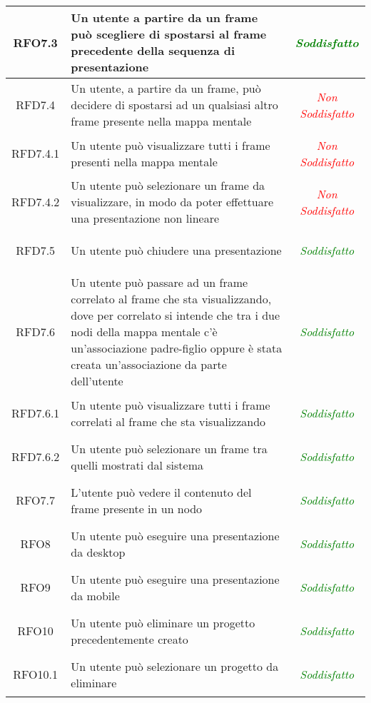 \begin{longtable}{|c|>{\centering}m{7cm}|c|}
\hypertarget{RFO7.3}{RFO7.3} & Un utente a partire da un frame può scegliere di spostarsi al frame precedente della sequenza di presentazione & \textcolor{Green}{\textit{Soddisfatto}}\\ \hline
\hypertarget{RFD7.4}{RFD7.4} & Un utente, a partire da un frame, può decidere di spostarsi ad un qualsiasi altro frame presente nella mappa mentale & \textcolor{Red}{\textit{Non Soddisfatto}}\\ \hline
\hypertarget{RFD7.4.1}{RFD7.4.1} & Un utente può visualizzare tutti i frame presenti nella mappa mentale & \textcolor{Red}{\textit{Non Soddisfatto}}\\ \hline
\hypertarget{RFD7.4.2}{RFD7.4.2} & Un utente può selezionare un frame da visualizzare, in modo da poter effettuare una presentazione non lineare & \textcolor{Red}{\textit{Non Soddisfatto}}\\ \hline
\hypertarget{RFD7.5}{RFD7.5} & Un utente può chiudere una presentazione & \textcolor{Green}{\textit{Soddisfatto}}\\ \hline
\hypertarget{RFD7.6}{RFD7.6} & Un utente può passare ad un frame correlato al frame che sta visualizzando, dove per correlato si intende che tra i due nodi della mappa mentale c’è un’associazione padre-figlio oppure è stata creata un’associazione da parte dell’utente & \textcolor{Green}{\textit{Soddisfatto}}\\ \hline
\hypertarget{RFD7.6.1}{RFD7.6.1} & Un utente può visualizzare tutti i frame correlati al frame che sta visualizzando & \textcolor{Green}{\textit{Soddisfatto}}\\ \hline
\hypertarget{RFD7.6.2}{RFD7.6.2} & Un utente può selezionare un frame tra quelli mostrati dal sistema & \textcolor{Green}{\textit{Soddisfatto}}\\ \hline
\hypertarget{RFO7.7}{RFO7.7} & L'utente può vedere il contenuto del frame presente in un nodo & \textcolor{Green}{\textit{Soddisfatto}}\\ \hline
\hypertarget{RFO8}{RFO8} & Un utente può eseguire una presentazione da desktop & \textcolor{Green}{\textit{Soddisfatto}}\\ \hline
\hypertarget{RFO9}{RFO9} & Un utente può eseguire una presentazione da mobile & \textcolor{Green}{\textit{Soddisfatto}}\\ \hline
\hypertarget{RFO10}{RFO10} & Un utente può eliminare un progetto precedentemente creato & \textcolor{Green}{\textit{Soddisfatto}}\\ \hline
\hypertarget{RFO10.1}{RFO10.1} & Un utente può selezionare un progetto da eliminare & \textcolor{Green}{\textit{Soddisfatto}}\\ \hline

\end{longtable}
